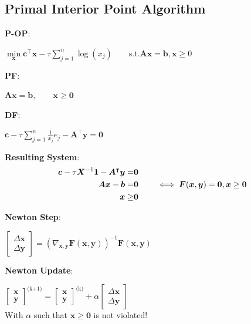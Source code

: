 \documentclass[english]{latex4ei/latex4ei_sheet}
\begin{document}
\begin{sectionbox}
	\subsection{Primal Interior Point Algorithm}
	\vspace{0.5em}
	\textbf{P-OP}: \\
	\begin{center}
		$\min\limits_{\bm{x}} \bm{c}^\intercal\bm{x} - \tau \sum\limits_{j=1}^{n} \log(x_j) \qquad \text{s.t.} \bm{A}\bm{x} = \bm{b}, \bm{x} \geq 0$
	\end{center}
	\vspace{0.5em}
	
	\textbf{PF}:
	\begin{center}
		$\bm{A}\bm{x} = \bm{b}, \qquad \bm{x} \geq \bm{0}$
	\end{center}
	\vspace{0.5em}
	
	\textbf{DF}:
	\begin{center}
		$\bm{c} - \tau \sum\limits_{j=1}^{n} \frac{1}{x_j}e_j - \bm{A}^\intercal \bm{y} = \bm{0} $
	\end{center}

	\textbf{Resulting System}:
	\begin{align}
		\bm{c} - \tau \bm{X}^{-1}\mathbf{1} - \bm{A}^\intercal\bm{y} = & \bm{0} \notag\\
		\bm{A}\bm{x} - \bm{b} = & \bm{0} \qquad \iff \bm{F}(\bm{x}, \bm{y}) = \bm{0}, \bm{x} \geq \bm{0} \notag\\
		\bm{x} \geq & \bm{0} \notag
	\end{align}
	\vspace{0.5em}
	
	\textbf{Newton Step}:
	\begin{center}
		$\begin{bmatrix}
			\Delta \bm{x} \\
			\Delta \bm{y}
		\end{bmatrix} = (\nabla_{\bm{x}, \bm{y}}\bm{F}(\bm{x}, \bm{y}))^{-1}\bm{F}(\bm{x}, \bm{y})$
	\end{center}
	\vspace{0.5em}
	
	\textbf{Newton Update}:
	\begin{center}
		$\begin{bmatrix}
			\bm{x} \\
			\bm{y}
		\end{bmatrix}^{\text{(k+1)}} = \begin{bmatrix}
		\bm{x} \\
		\bm{y}
	\end{bmatrix}^{\text{(k)}} + \alpha \begin{bmatrix}
	\Delta \bm{x} \\
	\Delta \bm{y}
\end{bmatrix}$ \\
		\vspace{0.3em}
		With $\alpha$ such that $\bm{x} \geq \bm{0}$ is not violated!
	\end{center}
	
\end{sectionbox}
\end{document}
